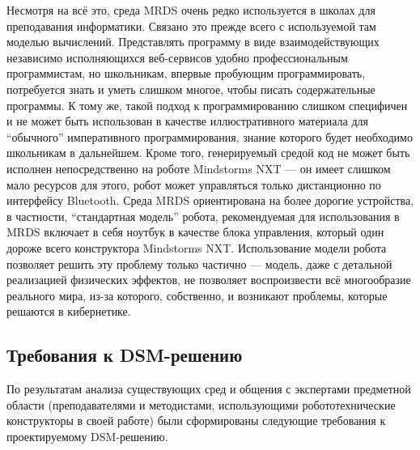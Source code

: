 Несмотря на всё это, среда MRDS очень редко используется в школах для преподавания 
информатики. Связано это прежде всего с используемой там моделью вычислений. Представлять 
программу в виде взаимодействующих независимо исполняющихся веб-сервисов удобно профессиональным 
программистам, но школьникам, впервые пробующим программировать, потребуется знать и 
уметь слишком многое, чтобы писать содержательные программы. К тому же, такой подход к 
программированию слишком специфичен и не может быть использован в качестве иллюстративного 
материала для "`обычного"' императивного программирования, знание которого будет необходимо 
школьникам в дальнейшем. Кроме того, генерируемый средой код не может быть исполнен 
непосредственно на роботе Mindstorms NXT --- он имеет слишком мало ресурсов для этого, 
робот может управляться только дистанционно по интерфейсу Bluetooth. Среда MRDS ориентирована 
на более дорогие устройства, в частности, "`стандартная модель"' робота, рекомендуемая 
для использования в MRDS включает в себя ноутбук в качестве блока управления, который 
один дороже всего конструктора Mindstorms NXT. Использование модели робота позволяет 
решить эту проблему только частично --- модель, даже с детальной реализацией физических 
эффектов, не позволяет воспроизвести всё многообразие реального мира, из-за которого, 
собственно, и возникают проблемы, которые решаются в кибернетике.

\subsection{Требования к DSM-решению}
По результатам анализа существующих сред и общения с экспертами предметной области 
(преподавателями и методистами, использующими робототехнические конструкторы в своей работе) 
были сформированы следующие требования к проектируемому DSM-решению.

